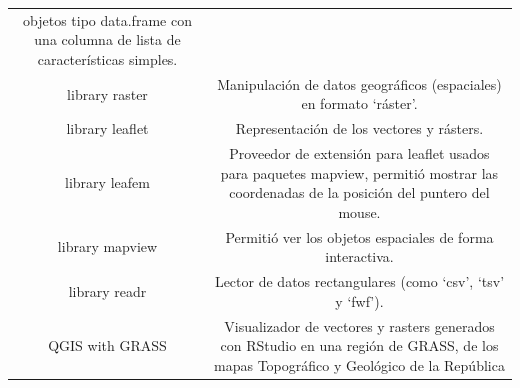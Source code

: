 \documentclass[11pt,]{article}
\begin{document}
\begin{longtable}[]{@{}cc@{}}
\begin{minipage}[t]{0.83\columnwidth}
objetos tipo data.frame con una columna de lista de características
simples.\strut
\end{minipage}\tabularnewline
\begin{minipage}[t]{0.11\columnwidth}\centering\strut
library raster\strut
\end{minipage} & \begin{minipage}[t]{0.83\columnwidth}\centering\strut
Manipulación de datos geográficos (espaciales) en formato
`ráster'.\strut
\end{minipage}\tabularnewline
\begin{minipage}[t]{0.11\columnwidth}\centering\strut
library leaflet\strut
\end{minipage} & \begin{minipage}[t]{0.83\columnwidth}\centering\strut
Representación de los vectores y rásters.\strut
\end{minipage}\tabularnewline
\begin{minipage}[t]{0.11\columnwidth}\centering\strut
library leafem\strut
\end{minipage} & \begin{minipage}[t]{0.83\columnwidth}\centering\strut
Proveedor de extensión para leaflet usados para paquetes mapview,
permitió mostrar las coordenadas de la posición del puntero del
mouse.\strut
\end{minipage}\tabularnewline
\begin{minipage}[t]{0.11\columnwidth}\centering\strut
library mapview\strut
\end{minipage} & \begin{minipage}[t]{0.83\columnwidth}\centering\strut
Permitió ver los objetos espaciales de forma interactiva.\strut
\end{minipage}\tabularnewline
\begin{minipage}[t]{0.11\columnwidth}\centering\strut
library readr\strut
\end{minipage} & \begin{minipage}[t]{0.83\columnwidth}\centering\strut
Lector de datos rectangulares (como `csv', `tsv' y `fwf').\strut
\end{minipage}\tabularnewline
\begin{minipage}[t]{0.11\columnwidth}\centering\strut
QGIS with GRASS\strut
\end{minipage} & \begin{minipage}[t]{0.83\columnwidth}\centering\strut
Visualizador de vectores y rasters generados con RStudio en una región
de GRASS, de los mapas Topográfico y Geológico de la República

\end{minipage}
\end{longtable}
\end{document}
